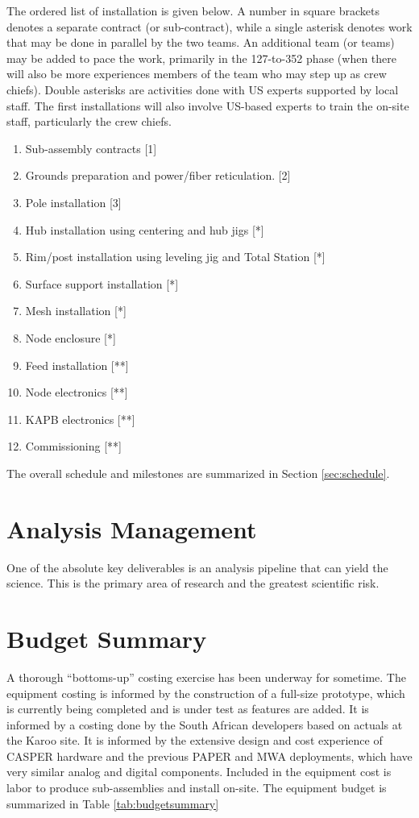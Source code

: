 \documentclass[preprint]{aastex}
\begin{document}
The ordered list of installation is given below. A number in square brackets denotes
a separate contract (or sub-contract), while a single asterisk denotes work that may
be done in parallel by the two teams. An additional team (or teams) may be added to
pace the work, primarily in the 127-to-352 phase (when there will also be more
experiences members of the team who may step up as crew chiefs). Double asterisks are
activities done with US experts supported by local staff. The first installations
will also involve US-based experts to train the on-site staff, particularly the crew
chiefs.
\begin{enumerate}[itemsep=-3pt]
\item Sub-assembly contracts [1]
\item Grounds preparation and power/fiber reticulation. [2]
\item Pole installation [3]
\item Hub installation using centering and hub jigs  [*]
\item Rim/post installation using leveling jig and Total Station [*]
\item Surface support installation [*]
\item Mesh installation [*]
\item Node enclosure [*]
\item Feed installation [**]
\item Node electronics [**]
\item KAPB electronics [**]
\item Commissioning [**]
\end{enumerate}

The overall schedule and milestones are summarized in Section \ref{sec:schedule}.


\section{Analysis Management}
\label{sec:analysis}
One of the absolute key deliverables is an analysis pipeline that can yield the science.  This is the primary area of
research and the greatest scientific risk.

\section{Budget Summary}
\label{sec:budget}
A thorough ``bottoms-up'' costing exercise has been underway for sometime. The equipment
costing is informed by the construction of a full-size prototype, which is currently
being completed and is under test as features are added. It is informed by a costing
done by the South African developers based on actuals at the Karoo site. It is
informed by the extensive design and cost experience of CASPER hardware and the
previous PAPER and MWA deployments, which have very similar analog and digital components.
Included in the equipment cost is labor to produce sub-assemblies and install on-site.
The equipment budget is summarized in Table \ref{tab:budgetsummary}

\end{document}
